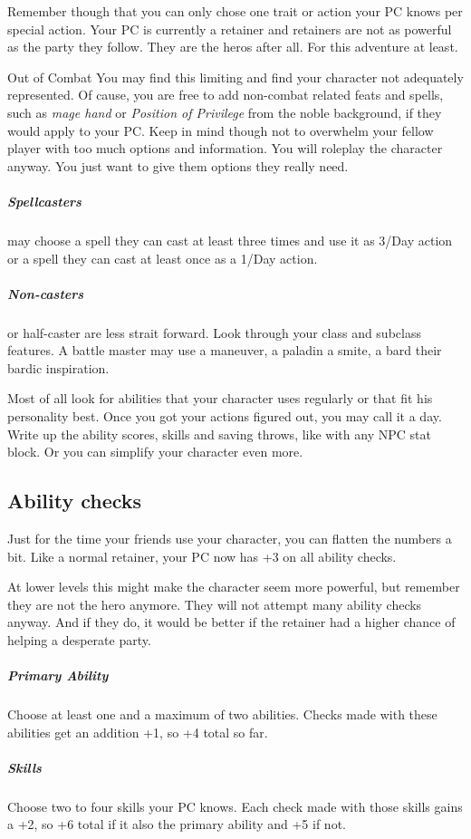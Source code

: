 \documentclass[letterpaper,10pt,twoside,twocolumn,openany]{book}
\begin{document}
Remember though that you can only chose one trait or action your PC knows per special action.
Your PC is currently a retainer and retainers are not as powerful as the party they follow.
They are the heros after all.
For this adventure at least.

\begin{DndComment}{Out of Combat}
    You may find this limiting and find your character not adequately represented.
    Of cause, you are free to add non-combat related feats and spells, such as \textit{mage hand} or \textit{Position of Privilege} from the noble background, if they would apply to your PC.
    Keep in mind though not to overwhelm your fellow player with too much options and information.
    You will roleplay the character anyway.
    You just want to give them options they really need.
\end{DndComment}

\subparagraph{Spellcasters} may choose a spell they can cast at least three times and use it as 3/Day action
or a spell they can cast at least once as a 1/Day action.

\subparagraph{Non-casters} or half-caster are less strait forward.
Look through your class and subclass features.
A battle master may use a maneuver, a paladin a smite, a bard their bardic inspiration.

Most of all look for abilities that your character uses regularly or that fit his personality best.
Once you got your actions figured out, you may call it a day.
Write up the ability scores, skills and saving throws, like with any NPC stat block.
Or you can simplify your character even more.

\subsection{Ability checks}
Just for the time your friends use your character, you can flatten the numbers a bit.
Like a normal retainer, your PC now has +3 on all ability checks.

At lower levels this might make the character seem more powerful, but remember they are not the hero anymore.
They will not attempt many ability checks anyway.
And if they do, it would be better if the retainer had a higher chance of helping a desperate party.

\subparagraph{Primary Ability}
Choose at least one and a maximum of two abilities.
Checks made with these abilities get an addition +1, so +4 total so far.

\subparagraph{Skills}
Choose two to four skills your PC knows.
Each check made with those skills gains a +2, so +6 total if it also the primary ability and +5 if not.
\end{document}

